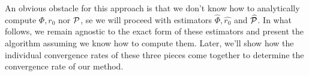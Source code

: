 An obvious obstacle for this approach is that we don't know how to analytically compute $ \Phi, r_{ 0 } $ nor $ \mathcal{P} $, se we will proceed with estimators $ \hat{ \Phi }, \hat{ r_{ 0 } } $ and $ \widehat{ \mathcal{P} } $.
In what follows, we remain agnostic to the exact form of these estimators and present the algorithm assuming we know how to compute them.
Later, we'll show how the individual convergence rates of these three pieces come together to determine the convergence rate of our method.

